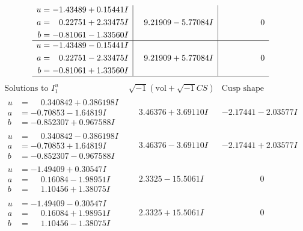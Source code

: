 \documentclass[1p]{elsarticle_modified}
\theoremstyle{definition}
\newcommand{\I}{\sqrt{-1}}
\begin{document}
$$\begin{array}{c|c|c}
\begin{aligned}
u &= -1.43489 + 0.15441 I \\
a &= \phantom{-}0.22751 + 2.33475 I \\
b &= -0.81061 - 1.33560 I\end{aligned}
 & \phantom{-}9.21909 - 5.77084 I & \phantom{-0.000000 } 0 \\ \hline\begin{aligned}
u &= -1.43489 - 0.15441 I \\
a &= \phantom{-}0.22751 - 2.33475 I \\
b &= -0.81061 + 1.33560 I\end{aligned}
 & \phantom{-}9.21909 + 5.77084 I & \phantom{-0.000000 } 0\\
 \hline 
 \end{array}$$\newpage$$\begin{array}{c|c|c}  
\text{Solutions to }I^u_{1}& \I (\text{vol} + \sqrt{-1}CS) & \text{Cusp shape}\\
 \hline 
\begin{aligned}
u &= \phantom{-}0.340842 + 0.386198 I \\
a &= -0.70853 - 1.64819 I \\
b &= -0.852307 + 0.967588 I\end{aligned}
 & \phantom{-}3.46376 + 3.69110 I & -2.17441 - 2.03577 I \\ \hline\begin{aligned}
u &= \phantom{-}0.340842 - 0.386198 I \\
a &= -0.70853 + 1.64819 I \\
b &= -0.852307 - 0.967588 I\end{aligned}
 & \phantom{-}3.46376 - 3.69110 I & -2.17441 + 2.03577 I \\ \hline\begin{aligned}
u &= -1.49409 + 0.30547 I \\
a &= \phantom{-}0.16084 - 1.98951 I \\
b &= \phantom{-}1.10456 + 1.38075 I\end{aligned}
 & \phantom{-}2.3325 - 15.5061 I & \phantom{-0.000000 } 0 \\ \hline\begin{aligned}
u &= -1.49409 - 0.30547 I \\
a &= \phantom{-}0.16084 + 1.98951 I \\
b &= \phantom{-}1.10456 - 1.38075 I\end{aligned}
 & \phantom{-}2.3325 + 15.5061 I & \phantom{-0.000000 } 0 \\ \hline\begin{aligned}

\end{aligned}
\end{array}$$
\end{document}
